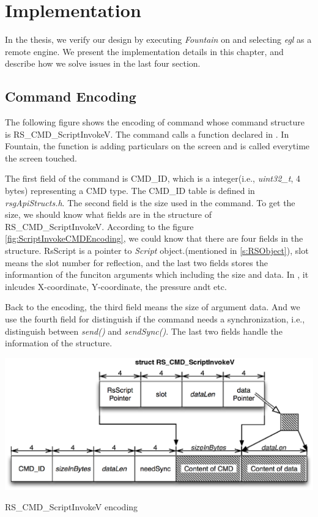 \chapter{Implementation}
\label{c:implementation}

In the thesis, we verify our design by executing \textit{Fountain} on \RRS and selecting \textit{egl} as a remote engine. We present the implementation details in this chapter, and describe how we solve issues in the last four section.

\section{Command Encoding}
\label{s:rsListeningThread}
The following figure shows the encoding of command whose command structure is RS\_CMD\_ScriptInvokeV. The command calls a function declared in \Core{}. In Fountain, the function is adding particulars on the screen and is called everytime the screen touched. 

The first field of the command is CMD\_ID, which is a integer(i.e., \textit{uint32\_t}, 4 bytes) representing a CMD type. The CMD\_ID table is defined in \textit{rsgApiStructs.h}. The second field is the size used in the command. To get the size, we should know what fields are in the structure of RS\_CMD\_ScriptInvokeV. According to the figure \ref{fig:ScriptInvokeCMDEncoding}, we could know that there are four fields in the structure. RsScript is a pointer to \textit{Script} object.(mentioned in \ref{s:RSObject}), slot means the slot number for reflection, and the last two fields stores the informantion of the funciton arguments which including the size and data. In \Fountain{}, it inlcudes X-coordinate, Y-coordinate, the pressure andt etc. 

Back to the encoding, the third field means the size of argument data. And we use the fourth field for distinguish if the command needs a synchronization, i.e., distinguish between \textit{send()} and \textit{sendSync()}. The last two fields handle the information of the structure. 

\begin{center-figure}
	\includegraphics[scale=0.8]{fig/ScriptInvokeCMDEncoding.eps}
	\caption{RS\_CMD\_ScriptInvokeV encoding}
	\label{fig:ScriptInvokeCMDEncoding}
\end{center-figure}

